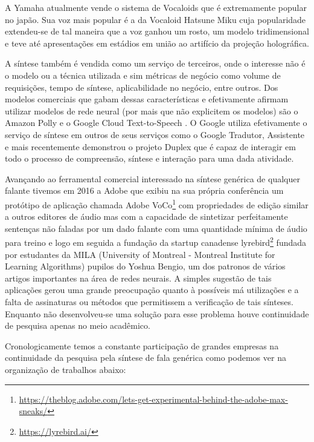 A Yamaha atualmente vende o sistema de Vocaloids que é extremamente popular no japão. Sua voz mais popular é a da Vocaloid Hatsune Miku cuja popularidade extendeu-se de tal maneira que a voz ganhou um rosto, um modelo tridimensional e teve até apresentações em estádios em união ao artifício da projeção holográfica.

A síntese também é vendida como um serviço de terceiros, onde o interesse não é o modelo ou a técnica utilizada e sim métricas de negócio como volume de requisições, tempo de síntese, aplicabilidade no negócio, entre outros. Dos modelos comerciais que gabam dessas características e efetivamente afirmam utilizar modelos de rede neural (por mais que não explicitem os modelos) são o Amazon Polly \cite{polly} e o Google Cloud Text-to-Speech \cite{cloud_tts}. O Google utiliza efetivamente o serviço de síntese em outros de seus serviços como o Google Tradutor, Assistente e mais recentemente demonstrou o projeto Duplex que é capaz de interagir em todo o processo de compreensão, síntese e interação para uma dada atividade. 

Avançando ao ferramental comercial interessado na síntese genérica de qualquer falante tivemos em 2016 a Adobe que exibiu na sua própria conferência um protótipo de aplicação chamada Adobe VoCo\footnote{\url{https://theblog.adobe.com/lets-get-experimental-behind-the-adobe-max-sneaks/}} com propriedades de edição similar a outros editores de áudio mas com a capacidade de sintetizar perfeitamente sentenças não faladas por um dado falante com uma quantidade mínima de áudio para treino e logo em seguida a fundação da startup canadense lyrebird\footnote{\url{https://lyrebird.ai/}} fundada por estudantes da MILA (University of Montreal - Montreal Institute for Learning Algorithms) pupilos do Yoshua Bengio, um dos patronos de vários artigos importantes na área de redes neurais. A simples sugestão de tais aplicações gerou uma grande preocupação quanto à possíveis má utilizações e a falta de assinaturas ou métodos que permitissem a verificação de tais sínteses. Enquanto não desenvolveu-se uma solução para esse problema houve continuidade de pesquisa apenas no meio acadêmico. 

Cronologicamente temos a constante participação de grandes empresas na continuidade da pesquisa pela síntese de fala genérica como podemos ver na organização de trabalhos abaixo:


